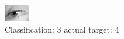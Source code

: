 \begin{figure}[h!]
\begin{center}
\includegraphics[width=0.60\columnwidth]{figures/ID2940_class_3_target_4.png}
\end{center}
\caption{ Classification: 3 actual target: 4}
\label{fig:ID2940_class_3_target_4}
\end{figure}
